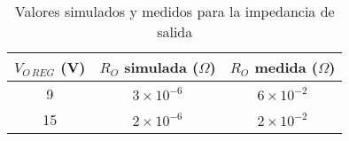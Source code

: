 \documentclass[e2_tp1_main.tex]{subfiles}
\begin{document}
\begin{table}[!htb]
\centering
\begin{tabular}{|c|c|c|}
\hline
$V_{O\,REG}$ (V) & $R_O$ simulada ($\Omega$) & $R_O$ medida ($\Omega$) \\ \hline\hline
9                & $3 \times 10^{-6}$        & $6 \times 10^{-2}$      \\ \hline
15               & $2 \times 10^{-6}$        & $2 \times 10^{-2}$      \\ \hline
\end{tabular}
\caption{Valores simulados y medidos para la impedancia de salida}
\label{table:rout}
\end{table}
\end{document}
